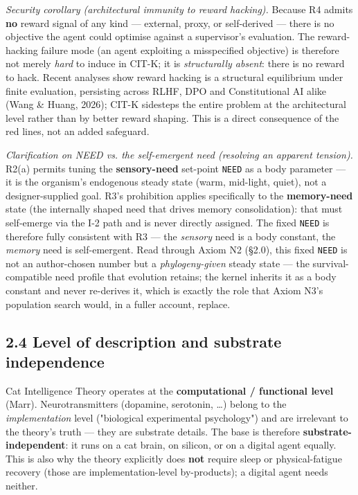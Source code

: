 \documentclass[11pt]{article}
\begin{document}
\emph{Security corollary (architectural immunity to reward hacking).} Because R4 admits \textbf{no} reward signal of any kind — external, proxy, or self-derived — there is no objective the agent could optimise against a supervisor's evaluation. The reward-hacking failure mode (an agent exploiting a misspecified objective) is therefore not merely \emph{hard} to induce in CIT-K; it is \emph{structurally absent}: there is no reward to hack. Recent analyses show reward hacking is a structural equilibrium under finite evaluation, persisting across RLHF, DPO and Constitutional AI alike (Wang \& Huang, 2026); CIT-K sidesteps the entire problem at the architectural level rather than by better reward shaping. This is a direct consequence of the red lines, not an added safeguard.

\emph{Clarification on NEED vs. the self-emergent need (resolving an apparent tension).} R2(a) permits tuning the \textbf{sensory-need} set-point \texttt{NEED} as a body parameter — it is the organism's endogenous steady state (warm, mid-light, quiet), not a designer-supplied goal. R3's prohibition applies specifically to the \textbf{memory-need} state (the internally shaped need that drives memory consolidation): that must self-emerge via the I-2 path and is never directly assigned. The fixed \texttt{NEED} is therefore fully consistent with R3 — the \emph{sensory} need is a body constant, the \emph{memory} need is self-emergent. Read through Axiom N2 (§2.0), this fixed \texttt{NEED} is not an author-chosen number but a \emph{phylogeny-given} steady state — the survival-compatible need profile that evolution retains; the kernel inherits it as a body constant and never re-derives it, which is exactly the role that Axiom N3's population search would, in a fuller account, replace.

\subsection{2.4 Level of description and substrate independence}
Cat Intelligence Theory operates at the \textbf{computational / functional level} (Marr). Neurotransmitters (dopamine, serotonin, …) belong to the \emph{implementation} level ("biological experimental psychology") and are irrelevant to the theory's truth — they are substrate details. The base is therefore \textbf{substrate-independent}: it runs on a cat brain, on silicon, or on a digital agent equally. This is also why the theory explicitly does \textbf{not} require sleep or physical-fatigue recovery (those are implementation-level by-products); a digital agent needs neither.
\end{document}
